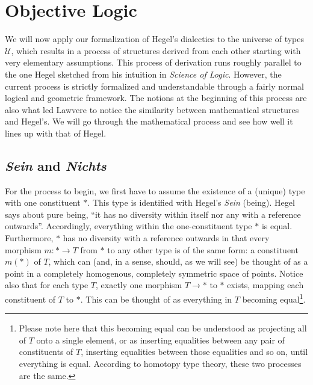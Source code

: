 \documentclass{article}
\begin{document}
\section{Objective Logic}
We will now apply our formalization of Hegel's dialectics to the universe of types $\mathcal{U}$, which
results in a process of structures derived from each other starting with very elementary assumptions. This
process of derivation runs roughly parallel to the one Hegel sketched from his intuition in \emph{Science of
Logic}. However, the current process is strictly formalized and understandable through a fairly normal
logical and geometric framework. The notions at the beginning of this process are also what led Lawvere to
notice the similarity between mathematical structures and Hegel's. We will go through the mathematical
process and see how well it lines up with that of Hegel.


\subsection{\emph{Sein} and \emph{Nichts}}
For the process to begin, we first have to assume the existence of a (unique) type with one constituent $*$.
This type is identified with Hegel's \emph{Sein} (being). Hegel says about pure being, ``it has no diversity
within itself nor any with a reference outwards''. Accordingly, everything within the one-constituent type
$*$ is equal. Furthermore, $*$ has no diversity with a reference outwards in that every morphism
$m:*\rightarrow T$ from $*$ to any other type is of the same form: a constituent $m(*)$ of $T$, which can
(and, in a sense, should, as we will see) be thought of as a point in a completely homogenous, completely
symmetric space of points. Notice also that for each type $T$, exactly one morphism $T\rightarrow *$ to $*$
exists, mapping each constituent of $T$ to $*$. This can be thought of as everything in $T$ becoming
equal\footnote{Please note here that this becoming equal can be understood as projecting all of $T$ onto a 
single element, or as inserting equalities between any pair of constituents of $T$, inserting equalities 
between those equalities and so on, until everything is equal. According to homotopy type theory, these two 
processes are the same.}. \\ 
\end{document}
